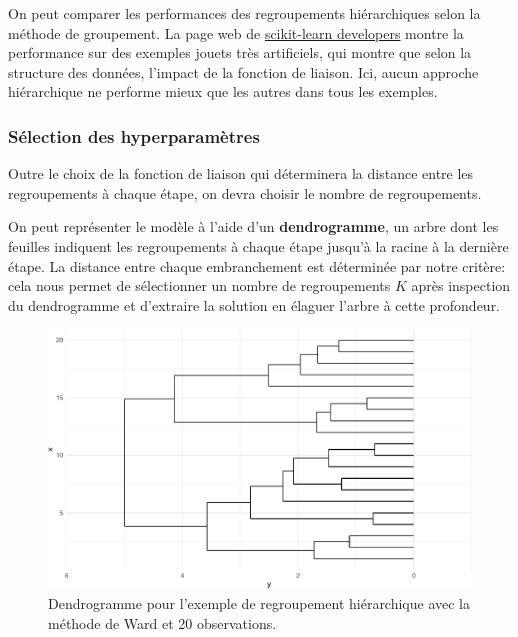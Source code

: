 \documentclass[
  11pt,
  letterpaper,
]{scrbook}
\theoremstyle{definition}
\theoremstyle{remark}
\begin{document}
On peut comparer les performances des regroupements hiérarchiques selon
la méthode de groupement. La page web de
\href{https://scikit-learn.org/stable/auto_examples/cluster/plot_linkage_comparison.html}{scikit-learn
developers} montre la performance sur des exemples jouets très
artificiels, qui montre que selon la structure des données, l'impact de
la fonction de liaison. Ici, aucun approche hiérarchique ne performe
mieux que les autres dans tous les exemples.

\hypertarget{suxe9lection-des-hyperparamuxe8tres}{%
\subsubsection{Sélection des
hyperparamètres}\label{suxe9lection-des-hyperparamuxe8tres}}

Outre le choix de la fonction de liaison qui déterminera la distance
entre les regroupements à chaque étape, on devra choisir le nombre de
regroupements.

On peut représenter le modèle à l'aide d'un \textbf{dendrogramme}, un
arbre dont les feuilles indiquent les regroupements à chaque étape
jusqu'à la racine à la dernière étape. La distance entre chaque
embranchement est déterminée par notre critère: cela nous permet de
sélectionner un nombre de regroupements \(K\) après inspection du
dendrogramme et d'extraire la solution en élaguer l'arbre à cette
profondeur.

\begin{figure}[ht!]

{\centering \includegraphics[width=1\textwidth,height=\textheight]{./03-regroupements_files/figure-pdf/fig-dendrogramme-1.pdf}

}

\caption{\label{fig-dendrogramme}Dendrogramme pour l'exemple de
regroupement hiérarchique avec la méthode de Ward et 20 observations.}

\end{figure}
\end{document}
